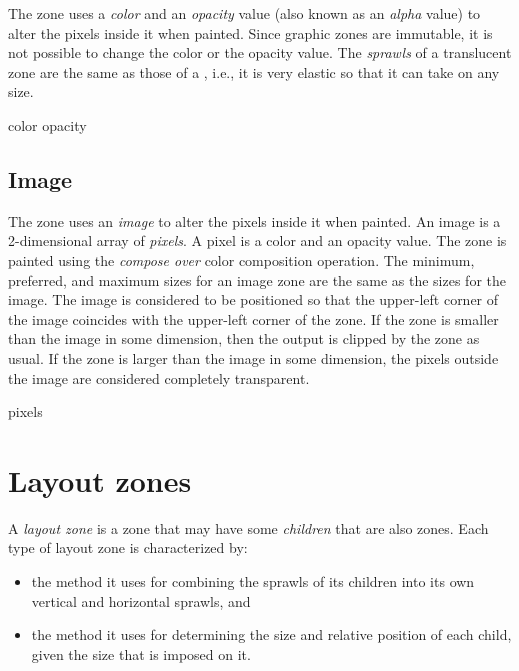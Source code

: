 The  zone uses a \emph{color} and an \emph{opacity}
value (also known as an \emph{alpha} value) to alter the pixels inside
it when painted.  Since graphic zones are immutable, it is not
possible to change the color or the opacity value.  The \emph{sprawls}
of a translucent zone are the same as those of a 
, i.e., it is very elastic so that it
can take on any size.


 {color opacity}

\subsection{Image}
\label{sec-zones-graphic-image}

The  zone uses an \emph{image} to alter the pixels inside
it when painted.  An image is a 2-dimensional array of \emph{pixels}.
A pixel is a color and an opacity value.  The zone is painted using
the \emph{compose over} color composition operation.  The minimum,
preferred, and maximum sizes for an image zone are the same as the
sizes for the image.  The image is considered to be positioned so that
the upper-left corner of the image coincides with the upper-left
corner of the zone.  If the zone is smaller than the image in some
dimension, then the output is clipped by the zone as usual.  If the
zone is larger than the image in some dimension, the pixels outside
the image are considered completely transparent.


 {pixels}

\section{Layout zones}
\label{sec-zones-layout}

A \emph{layout zone} is a zone that may have some \emph{children} that
are also zones.  Each type of layout zone is characterized by:

\begin{itemize}
\item the method it uses for combining the sprawls of its children
  into its own vertical and horizontal sprawls, and
\item the method it uses for determining the size and relative
  position of each child, given the size that is imposed on it. 
\end{itemize}


